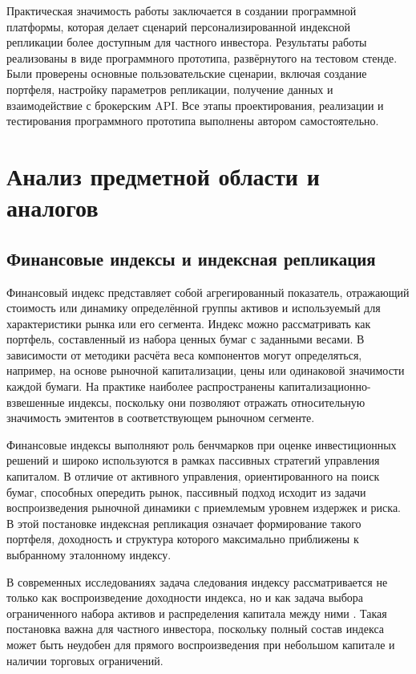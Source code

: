 \documentclass[14pt]{gost-7-32}
\begin{document}
Практическая значимость работы заключается в создании программной платформы, которая делает сценарий персонализированной индексной репликации более доступным для частного инвестора. Результаты работы реализованы в виде программного прототипа, развёрнутого на тестовом стенде. Были проверены основные пользовательские сценарии, включая создание портфеля, настройку параметров репликации, получение данных и взаимодействие с брокерским API. Все этапы проектирования, реализации и тестирования программного прототипа выполнены автором самостоятельно.

\newpage
\section{Анализ предметной области и аналогов}

\subsection{Финансовые индексы и индексная репликация}

Финансовый индекс представляет собой агрегированный показатель, отражающий стоимость или динамику определённой группы активов и используемый для характеристики рынка или его сегмента. Индекс можно рассматривать как портфель, составленный из набора ценных бумаг с заданными весами. В зависимости от методики расчёта веса компонентов могут определяться, например, на основе рыночной капитализации, цены или одинаковой значимости каждой бумаги. На практике наиболее распространены капитализационно-взвешенные индексы, поскольку они позволяют отражать относительную значимость эмитентов в соответствующем рыночном сегменте.

Финансовые индексы выполняют роль бенчмарков при оценке инвестиционных решений и широко используются в рамках пассивных стратегий управления капиталом. В отличие от активного управления, ориентированного на поиск бумаг, способных опередить рынок, пассивный подход исходит из задачи воспроизведения рыночной динамики с приемлемым уровнем издержек и риска. В этой постановке индексная репликация означает формирование такого портфеля, доходность и структура которого максимально приближены к выбранному эталонному индексу.

В современных исследованиях задача следования индексу рассматривается не только как воспроизведение доходности индекса, но и как задача выбора ограниченного набора активов и распределения капитала между ними \cite{satpathySparseIndexTracking2022,yamagataSparseIndexTracking2024}. Такая постановка важна для частного инвестора, поскольку полный состав индекса может быть неудобен для прямого воспроизведения при небольшом капитале и наличии торговых ограничений.
\end{document}
